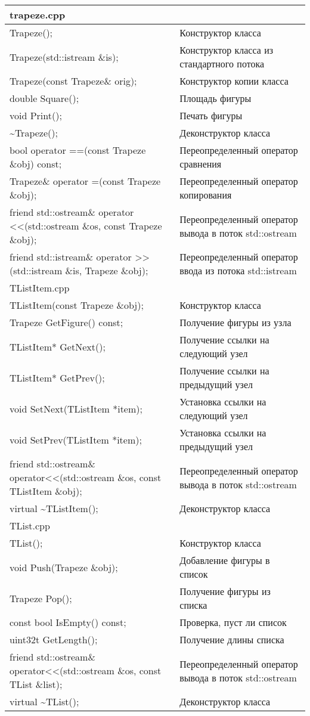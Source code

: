 \begin{longtable}{|p{7.5cm}|p{7.5cm}|}
\hline
\rowcolor{lightgray}
\multicolumn{2}{|c|} {trapeze.cpp}\\
\hline
Trapeze();&Конструктор класса\\
\hline
Trapeze(std::istream \&is);&Конструктор класса из стандартного потока\\
\hline
Trapeze(const Trapeze\& orig);&Конструктор копии класса\\
\hline
double Square();&Площадь фигуры\\
\hline
void Print();&Печать фигуры\\
\hline
\textasciitilde Trapeze();&Деконструктор класса\\
\hline
bool operator ==(const Trapeze \&obj) const;&Переопределенный оператор сравнения\\
\hline
Trapeze\& operator =(const Trapeze \&obj);&Переопределенный оператор копирования\\
\hline
friend std::ostream\& operator <<(std::ostream \&os, const Trapeze \&obj);&Переопределенный оператор вывода в поток std::ostream\\
\hline
friend std::istream\& operator >>(std::istream \&is, Trapeze \&obj);&Переопределенный оператор ввода из потока std::istream\\
\hline
\rowcolor{lightgray}
\multicolumn{2}{|c|} {TListItem.cpp}\\
\hline
TListItem(const Trapeze \&obj);&Конструктор класса\\
\hline
Trapeze GetFigure() const;&Получение фигуры из узла\\
\hline
TListItem* GetNext();&Получение ссылки на следующий узел\\
\hline
TListItem* GetPrev();&Получение ссылки на предыдущий узел\\
\hline
void SetNext(TListItem *item);&Установка ссылки на следующий узел\\
\hline
void SetPrev(TListItem *item);&Установка ссылки на предыдущий узел\\
\hline
friend std::ostream\& operator<<(std::ostream \&os, const TListItem \&obj);&Переопределенный оператор вывода в поток std::ostream\\
\hline
virtual \textasciitilde TListItem(){};&Деконструктор класса\\
\hline
\rowcolor{lightgray}
\multicolumn{2}{|c|} {TList.cpp}\\
\hline
TList();&Конструктор класса\\
\hline
void Push(Trapeze \&obj);&Добавление фигуры в список\\
\hline
Trapeze Pop();&Получение фигуры из списка\\
\hline
const bool IsEmpty() const;&Проверка, пуст ли список\\
\hline
uint32t GetLength();&Получение длины списка\\
\hline
friend std::ostream\& operator<<(std::ostream \&os, const TList \&list);&Переопределенный оператор вывода в поток std::ostream\\
\hline
virtual \textasciitilde TList();&Деконструктор класса\\
\hline
\end{longtable}

